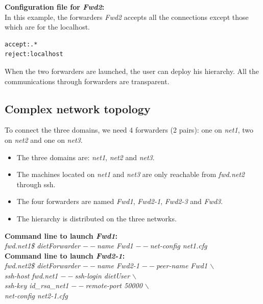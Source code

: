 \noindent\textbf{Configuration file for \textit{Fwd2}:}\\
In this example, the forwarders \textit{Fwd2} accepts all the
connections except those which are for the localhost.
\begin{verbatim}
accept:.*
reject:localhost
\end{verbatim}

When the two forwarders are launched, the user can deploy his \diet
hierarchy. All the communications through  \diet forwarders are
transparent.

\subsection{Complex network topology}
To connect the three domains, we need 4 forwarders (2 pairs): one on
\textit{net1}, two on \textit{net2} and one on \textit{net3}.
\begin{itemize}
\item The three domains are: \textit{net1}, \textit{net2} and
  \textit{net3}.
\item The machines located on \textit{net1} and \textit{net3} are only
  reachable from \textit{fwd.net2} through ssh.
\item The four forwarders are named \textit{Fwd1}, \textit{Fwd2-1},
  \textit{Fwd2-3} and \textit{Fwd3}.
\item The \diet hierarchy is distributed on the three networks.\\
\end{itemize}

\noindent\textbf{Command line to launch \textit{Fwd1}: }\\
{\small \it fwd.net1\$ dietForwarder {\tiny$--$}name Fwd1
  {\tiny$--$}net-config net1.cfg}\\[2mm]

\noindent\textbf{Command line to launch \textit{Fwd2-1}: }\\
{\small \it fwd.net2\$ dietForwarder {\tiny$--$}name Fwd2-1
  {\tiny$--$}peer-name Fwd1 $\backslash$\\
  \hspace*{4.2cm}{\tiny$--$}ssh-host fwd.net1 {\tiny$--$}ssh-login
  dietUser $\backslash$\\
  \hspace*{4.2cm}{\tiny$--$}ssh-key id\_rsa\_net1
  {\tiny$--$}remote-port 50000 $\backslash$\\
  \hspace*{4.2cm}{\tiny$--$}net-config net2-1.cfg}\\[2mm]

